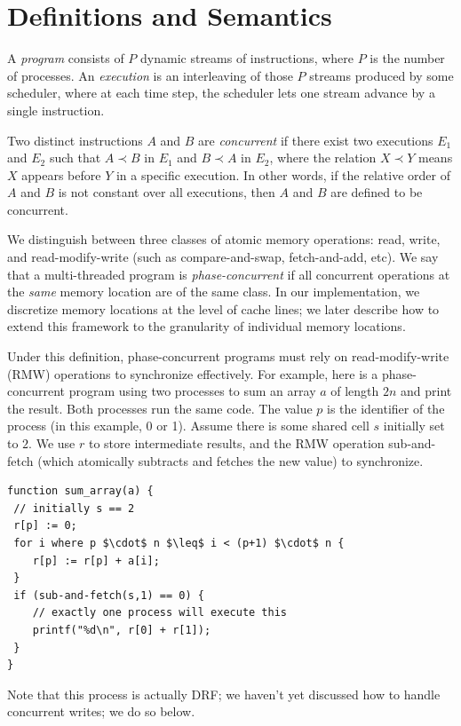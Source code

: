 \documentclass{article}
\begin{document}
\section{Definitions and Semantics}

A \textit{program} consists of $P$ dynamic streams of instructions, where $P$ is the number of processes. An \textit{execution} is an interleaving of those $P$ streams produced by some scheduler, where at each time step, the scheduler lets one stream advance by a single instruction.

Two distinct instructions $A$ and $B$ are \textit{concurrent} if there exist two executions $E_1$ and $E_2$ such that $A \prec B$ in $E_1$ and $B \prec A$ in $E_2$, where the relation $X \prec Y$ means $X$ appears before $Y$ in a specific execution. In other words, if the relative order of $A$ and $B$ is not constant over all executions, then $A$ and $B$ are defined to be concurrent.

We distinguish between three classes of atomic memory operations: read, write, and read-modify-write (such as compare-and-swap, fetch-and-add, etc). We say that a multi-threaded program is \textit{phase-concurrent} if all concurrent operations at the \textit{same} memory location are of the same class. In our implementation, we discretize memory locations at the level of cache lines; we later describe how to extend this framework to the granularity of individual memory locations.

Under this definition, phase-concurrent programs must rely on read-modify-write (RMW) operations to synchronize effectively. For example, here is a phase-concurrent program using two processes to sum an array $a$ of length $2n$ and print the result. Both processes run the same code. The value $p$ is the identifier of the process (in this example, 0 or 1). Assume there is some shared cell $s$ initially set to $2$. We use $r$ to store intermediate results, and the RMW operation sub-and-fetch (which atomically subtracts and fetches the new value) to synchronize.

\begin{lstlisting}
function sum_array(a) {
 // initially s == 2
 r[p] := 0;
 for i where p $\cdot$ n $\leq$ i < (p+1) $\cdot$ n {
 	r[p] := r[p] + a[i];
 }
 if (sub-and-fetch(s,1) == 0) {
 	// exactly one process will execute this
 	printf("%d\n", r[0] + r[1]);
 }
}
\end{lstlisting}

Note that this process is actually DRF; we haven't yet discussed how to handle concurrent writes; we do so below.
\end{document}
